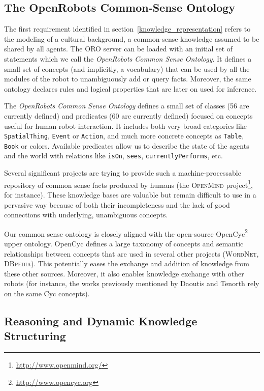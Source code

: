 \documentclass{svmult}
\newcommand{\concept}[1]{{\footnotesize \texttt{#1}}}
\begin{document}
\subsection{The OpenRobots Common-Sense Ontology}
\label{ontology}

The first requirement identified in section~\ref{knowledge_representation}
refers to the modeling of a cultural background, a common-sense knowledge
assumed to be shared by all agents.
The ORO server can be loaded with an initial set of statements which we call
the \emph{OpenRobots Common Sense Ontology}. It defines a small set of concepts
(and implicitly, a vocabulary) that can be used by all the modules of the robot
to unambiguously add or query facts. Moreover, the same ontology declares rules
and logical properties that are later on used for inference.

The \emph{OpenRobots Common Sense Ontology} defines a small set of classes (56
are currently defined) and predicates (60 are currently defined) focused on
concepts useful for human-robot interaction. It includes both very broad
categories like \concept{SpatialThing}, \concept{Event} or \concept{Action},
and much more concrete concepts as \concept{Table}, \concept{Book} or colors.
Available predicates allow us to describe the state of the agents and the world
with relations like \concept{isOn}, \concept{sees},
\concept{currentlyPerforms}, etc.

Several significant projects are trying to provide such a machine-processable
repository of common sense facts produced by humans (the \textsc{OpenMind}
project\footnote{\url{http://www.openmind.org/}}, for instance). These
knowledge bases are valuable but remain difficult to use in a pervasive way
because of both their incompleteness and the lack of good connections with
underlying, unambiguous concepts.

Our common sense ontology is closely aligned with the open-source
OpenCyc\footnote{\url{http://www.opencyc.org}} upper ontology.
OpenCyc defines a large taxonomy of concepts and semantic
relationships between concepts that are used in several other projects
(\textsc{WordNet, DBpedia}). This potentially eases the exchange and addition
of knowledge from these other sources. Moreover, it also enables knowledge
exchange with other robots (for instance, the works previously mentioned by
Daoutis and Tenorth rely on the same Cyc concepts).

\subsection{Reasoning and Dynamic Knowledge Structuring}
\end{document}
